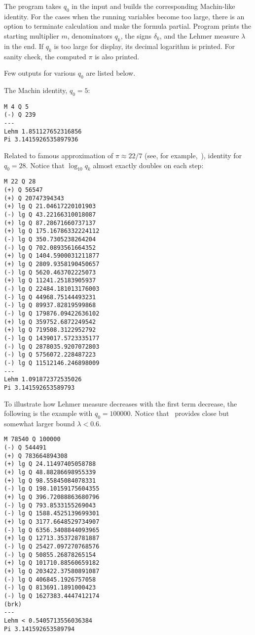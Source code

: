 \documentclass[draft, 11pt]{article} %
\begin{document}
The program takes $q_0$ in the input and builds the corresponding Machin-like identity.
For the cases when the running variables become too large, there is an option
to terminate calculation and make the formula partial. Program prints the starting
multiplier $m$, denominators $q_k$, the signs $\delta_k$, and the Lehmer
measure $\lambda$ in the end. If $q_k$ is too large for display, its decimal logarithm
is printed. For sanity check, the computed $\pi$ is also printed.

Few outputs for various $q_0$ are listed below.

The Machin identity, $q_0 = 5$:
\begin{verbatim}
M 4 Q 5
(-) Q 239
---
Lehm 1.851127652316856
Pi 3.1415926535897936
\end{verbatim}

Related to famous approximation of $\pi \approx 22/7$ (see, for example,~\cite{source-pi}),
identity for $q_0 = 28$. Notice that $\log_{10} q_k$ almost exactly doubles on each step:
\begin{verbatim}
M 22 Q 28
(+) Q 56547
(+) Q 20747394343
(+) lg Q 21.04617220101903
(-) lg Q 43.22166310018087
(+) lg Q 87.28671660737137
(+) lg Q 175.16786332224112
(-) lg Q 350.7305238264204
(-) lg Q 702.0893561664352
(+) lg Q 1404.5900031211877
(+) lg Q 2809.9358190450657
(-) lg Q 5620.463702225073
(+) lg Q 11241.25183905937
(-) lg Q 22484.181013176003
(-) lg Q 44968.75144493231
(-) lg Q 89937.82819599868
(-) lg Q 179876.09422636102
(+) lg Q 359752.6872249542
(+) lg Q 719508.3122952792
(-) lg Q 1439017.5723335177
(-) lg Q 2878035.9207072803
(-) lg Q 5756072.228487223
(-) lg Q 11512146.246898009
---
Lehm 1.091872372535026
Pi 3.141592653589793
\end{verbatim}

To illustrate how Lehmer measure decreases with the first term decrease, the following is
the example with $q_0 = 100000$. Notice that~ provides close but
somewhat larger bound $\lambda < 0.6$.

\begin{verbatim}
M 78540 Q 100000
(-) Q 544491
(+) Q 783664894308
(+) lg Q 24.11497405058788
(+) lg Q 48.88286698955339
(+) lg Q 98.55845084078331
(-) lg Q 198.10159175604355
(+) lg Q 396.72088863680796
(-) lg Q 793.8533155269043
(-) lg Q 1588.4525139699301
(+) lg Q 3177.6648529734907
(-) lg Q 6356.3408844093965
(+) lg Q 12713.353728781887
(-) lg Q 25427.097270768576
(-) lg Q 50855.26878265154
(+) lg Q 101710.88560659182
(+) lg Q 203422.37580891087
(-) lg Q 406845.1926757058
(-) lg Q 813691.1891000423
(-) lg Q 1627383.4447412174
(brk)
---
Lehm < 0.5405713556036384
Pi 3.141592653589794
\end{verbatim}
\end{document}
